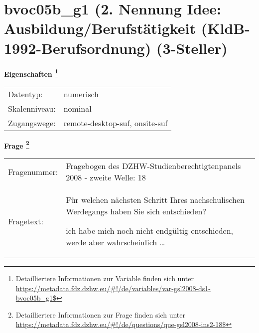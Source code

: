 
    \setcounter{footnote}{0}

    \vspace*{-1.8cm}
	\section{bvoc05b\_g1 (2. Nennung Idee: Ausbildung/Berufstätigkeit (KldB-1992-Berufsordnung) (3-Steller)}
	\label{section:bvoc05b_g1}



    \vspace*{0.5cm}
    \noindent\textbf{Eigenschaften
	\footnote{Detailliertere Informationen zur Variable finden sich unter
		\url{https://metadata.fdz.dzhw.eu/\#!/de/variables/var-gsl2008-ds1-bvoc05b_g1$}}}\\
	\begin{tabularx}{\hsize}{@{}lX}
	Datentyp: & numerisch \\
	Skalenniveau: & nominal \\
	Zugangswege: &
	  remote-desktop-suf, 
	  onsite-suf
 \\
    \end{tabularx}



				\vspace*{0.5cm}
                \noindent\textbf{Frage
	                \footnote{Detailliertere Informationen zur Frage finden sich unter
		              \url{https://metadata.fdz.dzhw.eu/\#!/de/questions/que-gsl2008-ins2-18$}}}\\
				\begin{tabularx}{\hsize}{@{}lX}
					Fragenummer: &
					  Fragebogen des DZHW-Studienberechtigtenpanels 2008 - zweite Welle:
					  18
 \\
					Fragetext: & Für welchen nächsten Schritt Ihres nachschulischen Werdegangs haben Sie sich entschieden?\par  ich habe mich noch nicht endgültig entschieden, werde aber wahrscheinlich … \\
				\end{tabularx}





